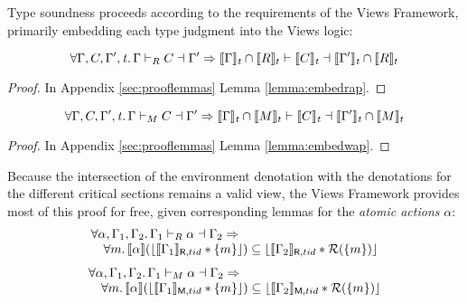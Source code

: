 Type soundness proceeds according to the requirements of the Views Framework, primarily embedding each type judgment into the Views logic:
\begin{lemma}
  \label{lemma:embedr}
\[  \forall\Gamma,C,\Gamma',\mathit{t}\ldotp\Gamma\vdash_R C\dashv \Gamma' \Rightarrow
\llbracket\Gamma\rrbracket_\mathit{t}\cap\llbracket{R}\rrbracket_t\vdash \llbracket C\rrbracket_\mathit{t}\dashv\llbracket\Gamma'\rrbracket_\mathit{t}\cap\llbracket{R}\rrbracket_t
\]
\end{lemma}
\begin{proof}
In Appendix \ref{sec:prooflemmas} Lemma \ref{lemma:embedrap}.
  \end{proof}
\begin{lemma}
  \label{lemma:embedw}
  \[
\forall\Gamma,C,\Gamma',\mathit{t}\ldotp\Gamma\vdash_M C\dashv \Gamma' \Rightarrow
\llbracket\Gamma\rrbracket_\mathit{t}\cap\llbracket{M}\rrbracket_t\vdash \llbracket C\rrbracket_\mathit{t}\dashv\llbracket\Gamma'\rrbracket_\mathit{t}\cap\llbracket{M}\rrbracket_t
\]
\end{lemma}
\begin{proof}
In Appendix \ref{sec:prooflemmas} Lemma \ref{lemma:embedwap}.
  \end{proof}
Because the intersection of the environment denotation with the denotations for the different critical sections remains a valid view, the Views Framework provides most of this proof for free, given corresponding lemmas for the \emph{atomic actions} $\alpha$:
\[\begin{array}{l}
\forall \alpha,\Gamma_1,\Gamma_2\ldotp \Gamma_1\vdash_R\alpha\dashv\Gamma_2 \Rightarrow
\\
\quad\forall m\ldotp   \llbracket \alpha \rrbracket  (\lfloor \llbracket \Gamma_{1} \rrbracket_{\textsf{R},tid}  * \{m\} \rfloor )\subseteq  \lfloor \llbracket \Gamma_{2} \rrbracket_{\textsf{R},tid} * \mathcal{R}(\{m\}) \rfloor
\end{array}\]
\[
\begin{array}{l}
\forall \alpha,\Gamma_1,\Gamma_2\ldotp \Gamma_1\vdash_M\alpha\dashv\Gamma_2 \Rightarrow
\\
\quad\forall m\ldotp   \llbracket \alpha \rrbracket  (\lfloor \llbracket \Gamma_{1} \rrbracket_{\textsf{M},tid}  * \{m\} \rfloor )\subseteq  \lfloor \llbracket \Gamma_{2} \rrbracket_{\textsf{M},tid} * \mathcal{R}(\{m\}) \rfloor
\end{array}
\]
